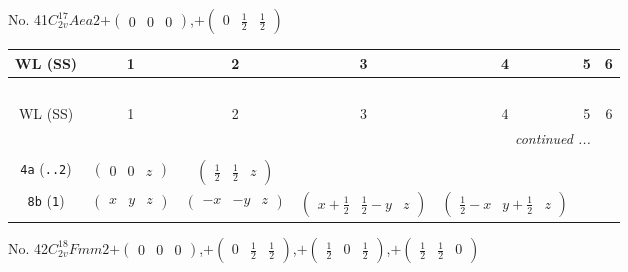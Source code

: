 \documentclass[fleqn,9pt,landscape]{jsarticle}
\begin{document}
No. 41\quad$C_{2v}^{17}$\quad$Aea2$\quad[ orthorhombic ]\quad$+\begin{pmatrix} 0 & 0 & 0 \end{pmatrix}$,\quad $+\begin{pmatrix} 0 & \frac{1}{2} & \frac{1}{2} \end{pmatrix}$
\begin{center}
\renewcommand{\arraystretch}{1.2}
\begin{longtable}{ccccccc}
 \hline \hline
WL (SS) & 1 & 2 & 3 & 4 & 5 & 6 \\ \hline \endfirsthead

\multicolumn{6}{l}{\tablename\ \thetable{}} \\
 \hline \hline
WL (SS) & 1 & 2 & 3 & 4 & 5 & 6 \\ \hline \endhead

 \hline \hline
\multicolumn{6}{r}{\footnotesize\it continued ...} \\ \endfoot

 \hline \hline
\multicolumn{6}{r}{} \\ \endlastfoot

{\tt 4a} ({\tt ..2}) & $ \begin{pmatrix} 0 & 0 & z \end{pmatrix} $ & $ \begin{pmatrix} \frac{1}{2} & \frac{1}{2} & z \end{pmatrix} $ & $  $ & $  $ \\ \hline
{\tt 8b} ({\tt 1}) & $ \begin{pmatrix} x & y & z \end{pmatrix} $ & $ \begin{pmatrix} - x & - y & z \end{pmatrix} $ & $ \begin{pmatrix} x + \frac{1}{2} & \frac{1}{2} - y & z \end{pmatrix} $ & $ \begin{pmatrix} \frac{1}{2} - x & y + \frac{1}{2} & z \end{pmatrix} $ \\
\end{longtable}
\end{center}
\newpage
No. 42\quad$C_{2v}^{18}$\quad$Fmm2$\quad[ orthorhombic ]\quad$+\begin{pmatrix} 0 & 0 & 0 \end{pmatrix}$,\quad $+\begin{pmatrix} 0 & \frac{1}{2} & \frac{1}{2} \end{pmatrix}$,\quad $+\begin{pmatrix} \frac{1}{2} & 0 & \frac{1}{2} \end{pmatrix}$,\quad $+\begin{pmatrix} \frac{1}{2} & \frac{1}{2} & 0 \end{pmatrix}$
\end{document}

